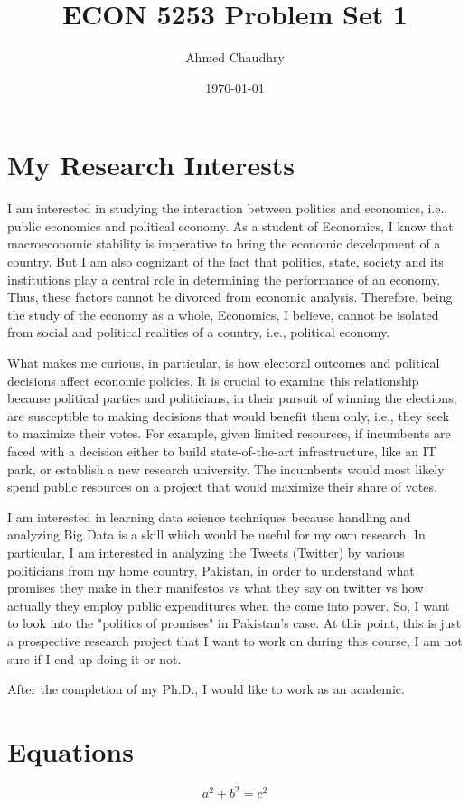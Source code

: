 \documentclass{article}
\title{ECON 5253 Problem Set 1}
\author{Ahmed Chaudhry}
\date{\today}
\begin{document}
\maketitle
\section{My Research Interests}
I am interested in studying the interaction between politics and economics, i.e., public economics and political economy. As a student of Economics, I know that macroeconomic stability is imperative to bring the economic development of a country. But I am also cognizant of the fact that politics, state, society and its institutions play a central role in determining the performance of an economy. Thus, these factors cannot be divorced from economic analysis. Therefore, being the study of the economy as a whole, Economics, I believe, cannot be isolated from social and political realities of a country, i.e., political economy.

What makes me curious, in particular, is how electoral outcomes and political decisions affect economic policies. It is crucial to examine this relationship because political parties and politicians, in their pursuit of winning the elections, are susceptible to making decisions that would benefit them only, i.e., they seek to maximize their votes. For example, given limited resources, if incumbents are faced with a decision either to build state-of-the-art infrastructure, like an IT park, or establish a new research university. The incumbents would most likely spend public resources on a project that would maximize their share of votes.

I am interested in learning data science techniques because handling and analyzing Big Data is a skill which would be useful for my own research. In particular, I am interested in analyzing the Tweets (Twitter) by various politicians from my home country, Pakistan, in order to understand what promises they make in their manifestos vs what they say on twitter vs how actually they employ public expenditures when the come into power. So, I want to look into the "politics of promises" in Pakistan's case. At this point, this is just a prospective research project that I want to work on during this course, I am not sure if I end up doing it or not.

After the completion of my Ph.D., I would like to work as an academic.

\section{Equations}
$$a^2 + b^2 = c^2$$
\end{document}
